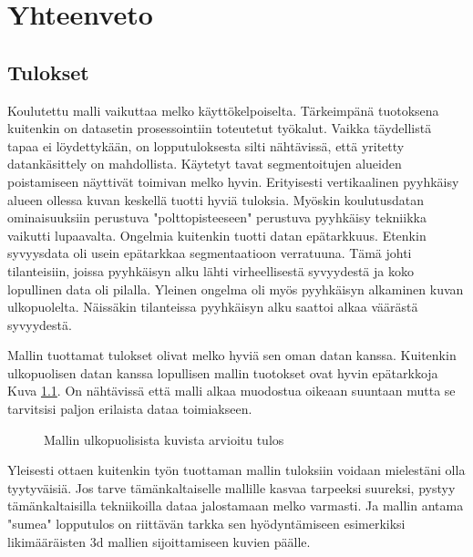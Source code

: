 \chapter{Yhteenveto}%
\label{ch:yhteenveto}

\section{Tulokset}

Koulutettu malli vaikuttaa melko käyttökelpoiselta. Tärkeimpänä tuotoksena kuitenkin on datasetin prosessointiin toteutetut työkalut.
Vaikka täydellistä tapaa ei löydettykään, on lopputuloksesta silti nähtävissä, että yritetty datankäsittely on mahdollista.
Käytetyt tavat segmentoitujen alueiden poistamiseen näyttivät toimivan melko hyvin.
Erityisesti vertikaalinen pyyhkäisy alueen ollessa kuvan keskellä tuotti hyviä tuloksia.
Myöskin koulutusdatan ominaisuuksiin perustuva "polttopisteeseen" perustuva pyyhkäisy tekniikka vaikutti lupaavalta.
Ongelmia kuitenkin tuotti datan epätarkkuus.
Etenkin syvyysdata oli usein epätarkkaa segmentaatioon verratuuna. Tämä johti tilanteisiin, joissa pyyhkäisyn alku lähti virheellisestä syvyydestä ja koko lopullinen data oli pilalla. Yleinen ongelma oli myös pyyhkäisyn alkaminen kuvan ulkopuolelta.
Näissäkin tilanteissa pyyhkäisyn alku saattoi alkaa väärästä syvyydestä.

Mallin tuottamat tulokset olivat melko hyviä sen oman datan kanssa.
Kuitenkin ulkopuolisen datan kanssa lopullisen mallin tuotokset ovat hyvin epätarkkoja Kuva \ref{fig:ulkoinen}.
On nähtävissä että malli alkaa muodostua oikeaan suuntaan mutta se tarvitsisi paljon erilaista dataa toimiakseen.

\begin{figure}[h]
\centering
{}
\caption{Mallin ulkopuolisista kuvista arvioitu tulos}
\label{fig:ulkoinen}
\end{figure}

Yleisesti ottaen kuitenkin työn tuottaman mallin tuloksiin voidaan mielestäni olla tyytyväisiä.
Jos tarve tämänkaltaiselle mallille kasvaa tarpeeksi suureksi, pystyy tämänkaltaisilla tekniikoilla dataa jalostamaan melko varmasti.
Ja mallin antama "sumea" lopputulos on riittävän tarkka sen hyödyntämiseen esimerkiksi likimääräisten 3d mallien sijoittamiseen kuvien päälle.

